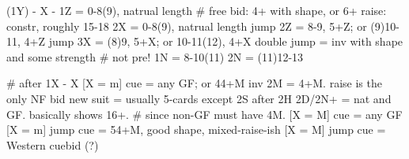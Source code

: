 (1Y) - X -
1Z = 0-8(9), natrual length  # free bid: 4+ with shape, or 6+
    raise: constr, roughly 15-18
2X = 0-8(9), natrual length
jump 2Z = 8-9, 5+Z; or (9)10-11, 4+Z
jump 3X = (8)9, 5+X; or 10-11(12), 4+X
double jump = inv with shape and some strength  # not pre!
1N = 8-10(11)
2N = (11)12-13

# after 1X - X
[X = m] cue = any GF; or 44+M inv 
    2M = 4+M. raise is the only NF bid 
        new suit = usually 5-cards except 2S after 2H
    2D/2N+ = nat and GF. basically shows 16+.  # since non-GF must have 4M.
[X = M] cue = any GF
[X = m] jump cue = 54+M, good shape, mixed-raise-ish
[X = M] jump cue = Western cuebid (?)